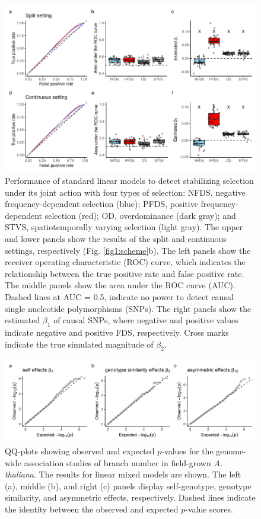 \documentclass[12pt,]{article}
\begin{document}
\begin{figure}[]
  \includegraphics[width=\linewidth]{beta1LMdomi.pdf}
  \caption{Performance of standard linear models to detect stabilizing selection under its joint action with four types of selection:  NFDS, negative frequency-dependent selection (blue); PFDS, positive frequency-dependent selection (red); OD, overdominance (dark gray); and STVS, spatiotemporally varying selection (light gray). The upper and lower panels show the results of the split and continuous settings, respectively (Fig. \ref{fig1:scheme}b). The left panels show the receiver operating characteristic (ROC) curve, which indicates the relationship between the true positive rate and false positive rate. The middle panels show the area under the ROC curve (AUC). Dashed lines at AUC = 0.5, indicate no power to detect causal single nucleotide polymorphisms (SNPs). The right panels show the estimated $\beta_1$ of causal SNPs, where negative and positive values indicate negative and positive FDS, respectively. Cross marks indicate the true simulated magnitude of $\beta_2$.}
  \label{figS7:beta1LM}
\end{figure}


\begin{figure}[]
  \includegraphics[width=\linewidth]{QQplotLMM.png}
  \caption{QQ-plots showing observed and expected $p$-values for the genome-wide association studies of branch number in field-grown \textit{A. thaliana}. The results for linear mixed models are shown. The left (a), middle (b), and right (c) panels display self-genotype, genotype similarity, and asymmetric effects, respectively. Dashed lines indicate the identity between the observed and expected $p$-value scores.}
  \label{figS9:QQplotLMM}
\end{figure}
\end{document}
